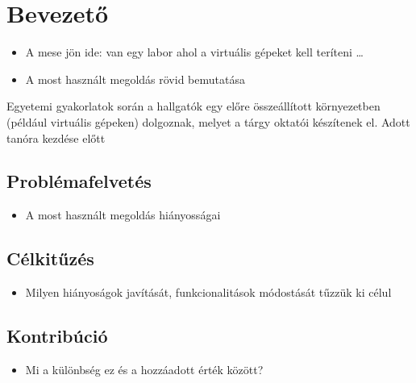 \chapter{Bevezető} 
\begin{itemize}
  \item A mese jön ide: van egy labor ahol a virtuális gépeket kell teríteni \ldots
  \item A most használt megoldás rövid bemutatása
\end{itemize}

Egyetemi gyakorlatok során a hallgatók egy előre összeállított környezetben (például virtuális
gépeken) dolgoznak, melyet a tárgy oktatói készítenek el. Adott tanóra kezdése előtt 

\section{Problémafelvetés}
\begin{itemize}
  \item A most használt megoldás hiányosságai 
\end{itemize}

\section{Célkitűzés}
\begin{itemize}
  \item Milyen hiányoságok javítását, funkcionalitások módostását tűzzük ki célul
\end{itemize}
\section{Kontribúció}
\begin{itemize}
  \item Mi a különbség ez és a hozzáadott érték között?
\end{itemize}

